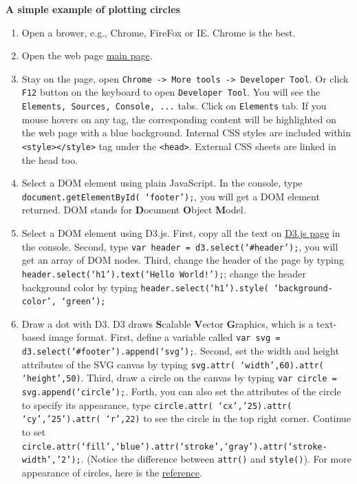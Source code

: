 \documentclass[a4paper, 11pt]{article}
\begin{document}
\textbf{A simple example of plotting circles}
\begin{enumerate}
\item Open a brower, e.g., Chrome, FireFox or IE. Chrome is the best.
\item Open the web page \href{http://nymph332088.github.io/CIS4340/index.html}{main page}.
\item Stay on the page, open \texttt{Chrome -> More tools -> Developer Tool}. Or click \texttt{F12} button on the keyboard to open \texttt{Developer Tool}. You will see the \texttt{Elements, Sources, Console, ...} tabs. Click on \texttt{Elements} tab. If you mouse hovers on any tag, the corresponding content will be highlighted on the web page with a blue background. Internal CSS styles are included within \texttt{<style></style>} tag under the \texttt{<head>}. External CSS sheets are linked in the head too.
\item Select a DOM element using plain JavaScript. In the console, type \texttt{document.getElementById( `footer');}, you will get a DOM element returned. DOM stands for {\bf D}ocument {\bf O}bject {\bf M}odel.
\item Select a DOM element using D3.js. First, copy all the text on \href{https://raw.githubusercontent.com/mbostock/d3/master/d3.min.js}{D3.js page} in the console. Second, type \texttt{var header = d3.select(`\#{header}');}, you will get an array of DOM nodes. Third, change the header of the page by typing \texttt{header.select(`h1').text(`Hello World!');}; change the header background color by typing \texttt{header.select(`h1').style( `background-color', `green');}
\item Draw a dot with D3. D3 draws {\bf S}calable {\bf V}ector {\bf G}raphics, which is a text-based image format. First, define a variable called \texttt{var svg = d3.select(`\#{footer}').append(`svg');}. Second, set the width and height attributes of the SVG canvas by typing {\tt svg.attr( `width',60).attr( `height',50)}. Third, draw a circle on the canvas by typing \texttt{var circle = svg.append(`circle');}. Forth, you can also set the attributes of the circle to specify its appearance, type \texttt{circle.attr( `cx','25).attr( `cy','25').attr( `r',22)} to see the circle in the top right corner. Continue to set \texttt{circle.attr(`fill',`blue').attr(`stroke',`gray').attr(`stroke-width','2');}. (Notice the difference between \texttt{attr()} and \texttt{style()}). For more appearance of circles, here is the \href{http://alignedleft.com/tutorials/d3/an-svg-primer}{reference}.


\end{enumerate}
\end{document}
